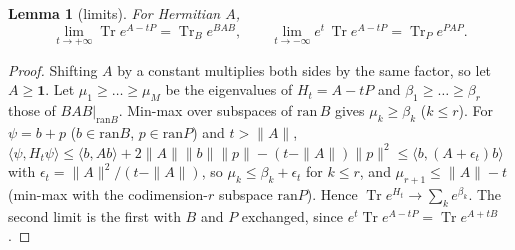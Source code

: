 \documentclass[11pt]{amsart}
\newtheorem{lemma}[theorem]{Lemma}
\theoremstyle{definition}
\theoremstyle{remark}
\numberwithin{equation}{section}
\newcommand{\Tr}{\operatorname{Tr}}
\newcommand{\one}{\mathbf{1}}
\begin{document}
\begin{lemma}[limits]\label{lem:limits}
For Hermitian $A$,
\[
\lim_{t\to+\infty}\Tr e^{A-tP}=\Tr_Be^{BAB},\qquad\lim_{t\to-\infty}e^t\,\Tr e^{A-tP}=\Tr_Pe^{PAP}.
\]
\end{lemma}

\begin{proof}
Shifting $A$ by a constant multiplies both sides by the same factor, so let $A\ge\one$. Let $\mu_1\ge\dots\ge\mu_M$ be
the eigenvalues of $H_t=A-tP$ and $\beta_1\ge\dots\ge\beta_r$ those of $BAB|_{\mathrm{ran}B}$. Min-max over subspaces
of $\mathrm{ran}\,B$ gives $\mu_k\ge\beta_k$ ($k\le r$). For $\psi=b+p$ ($b\in\mathrm{ran}B$, $p\in\mathrm{ran}P$) and
$t>\|A\|$, $\langle\psi,H_t\psi\rangle\le\langle b,Ab\rangle+2\|A\|\|b\|\|p\|-(t-\|A\|)\|p\|^2\le\langle b,(A+\epsilon_t)b\rangle$
with $\epsilon_t=\|A\|^2/(t-\|A\|)$, so $\mu_k\le\beta_k+\epsilon_t$ for $k\le r$, and $\mu_{r+1}\le\|A\|-t$ (min-max with
the codimension-$r$ subspace $\mathrm{ran}P$). Hence $\Tr e^{H_t}\to\sum_ke^{\beta_k}$. The second limit is the first
with $B$ and $P$ exchanged, since $e^t\Tr e^{A-tP}=\Tr e^{A+tB}$.
\end{proof}
\end{document}
